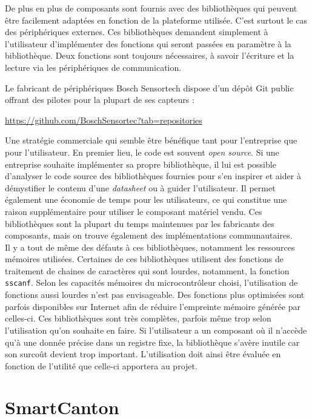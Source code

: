 De plus en plus de composants sont fournis avec des bibliothèques qui peuvent être facilement adaptées en fonction de la plateforme utilisée. C'est surtout le cas des périphériques externes. Ces bibliothèques demandent simplement à l'utilisateur d'implémenter des fonctions qui seront passées en paramètre à la bibliothèque.
Deux fonctions sont toujours nécessaires, à savoir l'écriture et la lecture via les périphériques de communication.

Le fabricant de périphériques Bosch Sensortech dispose d'un dépôt Git public offrant des pilotes pour la plupart de ses capteurs : 
\begin{center}
    \url{https://github.com/BoschSensortec?tab=repositories}
\end{center}

Une stratégie commerciale qui semble être bénéfique tant pour l'entreprise que pour l'utilisateur. En premier lieu, le code est souvent \textit{open source}. Si une entreprise souhaite implémenter sa propre bibliothèque, il lui est possible d'analyser le code source des bibliothèques fournies pour s'en inspirer et aider à démystifier le contenu d'une \textit{datasheet} ou à guider l'utilisateur. Il permet également une économie de temps pour les utilisateurs, ce qui constitue une raison supplémentaire pour utiliser le composant matériel vendu. Ces bibliothèques sont la plupart du temps maintenues par les fabricants des composants, mais on trouve également des implémentations communautaires.\\

Il y a tout de même des défauts à ces bibliothèques, notamment les ressources mémoires utilisées. Certaines de ces bibliothèques utilisent des fonctions de traitement de chaines de caractères qui sont lourdes, notamment, la fonction \texttt{sscanf}. Selon les capacités mémoires du microcontrôleur choisi, l'utilisation de fonctions aussi lourdes
n’est pas envisageable. Des fonctions plus optimisées sont parfois disponibles sur Internet afin de réduire l'empreinte mémoire générée par celles-ci. Ces bibliothèques sont très complètes, parfois même trop selon l'utilisation qu'on souhaite en faire. Si l'utilisateur a un composant où il n'accède qu'à une donnée précise dans un registre fixe, la bibliothèque s'avère inutile car son surcoût devient trop important. L'utilisation doit ainsi être évaluée en fonction de l'utilité que celle-ci apportera au projet. 


\section{SmartCanton}
\label{sec-stateoftheart_smartcanton}




